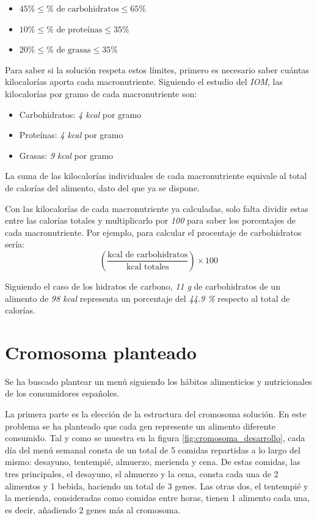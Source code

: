 \begin{itemize}
    \item $45\% \leq \% \text{ de carbohidratos} \leq 65\%$
    \item $10\% \leq \% \text{ de proteínas} \leq 35\%$
    \item $20\% \leq \% \text{ de grasas} \leq 35\%$
\end{itemize}

Para saber si la solución respeta estos límites, primero es necesario saber cuántas kilocalorías aporta cada macronutriente. Siguiendo el estudio del \textit{IOM}, las kilocalorías por gramo de cada macronutriente son:

\begin{itemize}
    \item Carbohidratos: \textit{4 kcal} por gramo
    \item Proteínas: \textit{4 kcal} por gramo
    \item Grasas: \textit{9 kcal} por gramo
\end{itemize}

La suma de las kilocalorías individuales de cada macronutriente equivale al total de calorías del alimento, dato del que ya se dispone.

Con las kilocalorías de cada macronutriente ya calculadas, solo falta dividir estas entre las calorías totales y multiplicarlo por \textit{100} para saber los porcentajes de cada macronutriente. Por ejemplo, para calcular el procentaje de carbohidratos sería:
\[
\left( \frac{\text{kcal de carbohidratos}}{\text{kcal totales}} \right) \times 100
\]

Siguiendo el caso de los hidratos de carbono, \textit{11 g} de carbohidratos de un alimento de \textit{98 kcal} representa un porcentaje del \textit{44.9 \%} respecto al total de calorías.


\section{Cromosoma planteado}
\label{ch:solucion-planteada}

Se ha buscado plantear un menú siguiendo los hábitos alimenticios y nutricionales de los consumidores españoles.

La primera parte es la elección de la estructura del cromosoma solución. En este problema se ha planteado que cada gen represente un alimento diferente consumido. Tal y como se muestra en la figura \ref{fig:cromosoma_desarrollo}, cada día del menú semanal consta de un total de 5 comidas repartidas a lo largo del mismo: desayuno, tentempié, almuerzo, merienda y cena. De estas comidas, las tres principales, el desayuno, el almuerzo y la cena, consta cada una de 2 alimentos y 1 bebida, haciendo un total de 3 genes. Las otras dos, el tentempié y la merienda, consideradas como comidas entre horas, tienen 1 alimento cada una, es decir, añadiendo 2 genes más al cromosoma.

